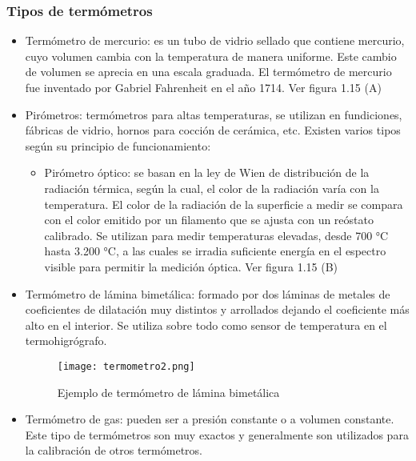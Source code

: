 \subsubsection{Tipos de termómetros \cite{termometro}}

\begin{itemize}
	\item Termómetro de mercurio: es un tubo de vidrio sellado que contiene mercurio, cuyo volumen cambia con la temperatura de manera uniforme. Este cambio de volumen se aprecia en una escala graduada. El termómetro de mercurio fue inventado por Gabriel Fahrenheit en el año 1714. Ver figura 1.15 (A)
	
	\item Pirómetros:  termómetros para altas temperaturas, se utilizan en fundiciones, fábricas de vidrio, hornos para cocción de cerámica, etc. Existen varios tipos según su principio de funcionamiento:
	
	\begin{itemize}
		
		\item Pirómetro óptico: se basan en la ley de Wien de distribución de la radiación térmica, según la cual, el color de la radiación varía con la temperatura. El color de la radiación de la superficie a medir se compara con el color emitido por un filamento que se ajusta con un reóstato calibrado. Se utilizan para medir temperaturas elevadas, desde 700 °C hasta 3.200 °C, a las cuales se irradia suficiente energía en el espectro visible para permitir la medición óptica. Ver figura 1.15 (B)
		
	\end{itemize}
	
	\item Termómetro de lámina bimetálica: formado por dos láminas de metales de coeficientes de dilatación muy distintos y arrollados dejando el coeficiente más alto en el interior. Se utiliza sobre todo como sensor de temperatura en el termohigrógrafo.
	
	\begin{figure}[H]
		\centering
		\texttt{[image: termometro2.png]}
		\caption{Ejemplo de termómetro de lámina bimetálica}
	\end{figure}
	
	\item Termómetro de gas: pueden ser a presión constante o a volumen constante. Este tipo de termómetros son muy exactos y generalmente son utilizados para la calibración de otros termómetros.
	

\end{itemize}
